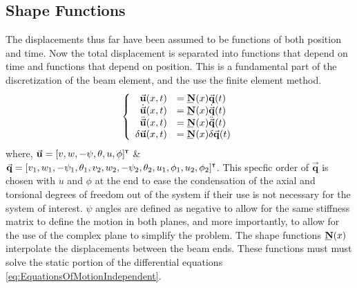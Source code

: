 \subsection{Shape Functions} \label{Shape Functions}
The displacements thus far have been assumed to be functions of both position and time. Now the total displacement is separated into functions that depend on time and functions that depend on position. This is a fundamental part of the discretization of the beam element, and the use the finite element method. 
\begin{equation} \label{eq:FEGoverning}
\left\{\begin{array}{rl}
\vec{\mathbf{u}}(x,t)&=\bunderline{\mathbf{N}}(x)\vec{\mathbf{q}}(t)\\
\dot{\vec{\mathbf{u}}}(x,t)&=\bunderline{\mathbf{N}}(x)\dot{\vec{\mathbf{q}}}(t)\\
\ddot{\vec{\mathbf{u}}}(x,t)&=\bunderline{\mathbf{N}}(x)\ddot{\vec{\mathbf{q}}}(t)\\
\delta\vec{\mathbf{u}}(x,t)&=\bunderline{\mathbf{N}}(x)\delta\vec{\mathbf{q}}(t)
\end{array}\right.
\end{equation}
where, $ \vec{\mathbf{u}}=[v,w,-\psi,\theta,u,\phi]^{\textbf{{\tiny \textsf{T}}}} $ \& $ \vec{\mathbf{q}}=[v_1,w_1,-\psi_1,\theta_1,v_2,w_2,-\psi_2,\theta_2,u_1,\phi_1,u_2,\phi_2]^{\textbf{{\tiny \textsf{T}}}} $. This specfic order of $ \vec{\mathbf{q}} $ is chosen with $ u $ and $ \phi $ at the end to ease the condensation of the axial and torsional degrees of freedom out of the system if their use is not necessary for the system of interest. $ \psi $ angles are defined as negative to allow for the same stiffness matrix to define the motion in both planes, and more importantly, to allow for the use of the complex plane to simplify the problem. The shape functions $ \bunderline{\mathbf{N}}(x) $ interpolate the displacements between the beam ends. These functions must must solve the static portion of the differential equations \eqref{eq:EquationsOfMotionIndependent}.
